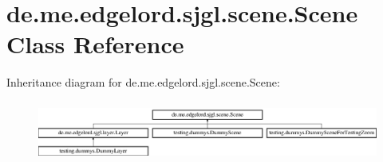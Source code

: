 \hypertarget{classde_1_1me_1_1edgelord_1_1sjgl_1_1scene_1_1_scene}{}\section{de.\+me.\+edgelord.\+sjgl.\+scene.\+Scene Class Reference}
\label{classde_1_1me_1_1edgelord_1_1sjgl_1_1scene_1_1_scene}
Inheritance diagram for de.\+me.\+edgelord.\+sjgl.\+scene.\+Scene\+:\begin{figure}[H]
\begin{center}
\leavevmode
\includegraphics[height=2.014389cm]{classde_1_1me_1_1edgelord_1_1sjgl_1_1scene_1_1_scene}
\end{center}
\end{figure}
